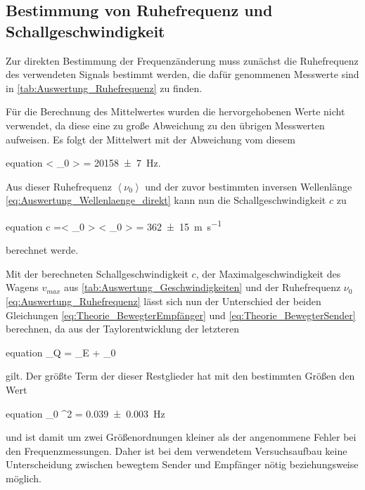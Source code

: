 	 
 	
 	
	
\subsection{Bestimmung von Ruhefrequenz und Schallgeschwindigkeit}
	
	Zur direkten Bestimmung der Frequenzänderung muss zunächst die Ruhefrequenz
	des verwendeten Signals bestimmt werden, die dafür genommenen Messwerte  
	sind in \cref{tab:Auswertung_Ruhefrequenz} zu finden.  
	
		
	
	Für die Berechnung des Mittelwertes wurden die hervorgehobenen Werte nicht verwendet,
	da diese eine zu große Abweichung zu den übrigen Messwerten aufweisen. Es folgt
	der Mittelwert mit der Abweichung vom diesem
	\begin{empheq}{equation}
		\label{eq:Auswertung_Ruhefrequenz}
		\left< \nu_{0} \right> = \SI{20158(7)}{\hertz}.
	\end{empheq} 
	
	Aus dieser Ruhefrequenz $\left< \nu_{0} \right>$ und der zuvor bestimmten inversen Wellenlänge 
	\cref{eq:Auswertung_Wellenlaenge_direkt} kann nun die Schallgeschwindigkeit $c$ zu
	\begin{empheq}{equation}
		c =\left<  \lambda_{0} \right> \cdot \left< \nu_{0} \right> = \SI{362(15)}{\meter\per\second}
	\end{empheq}
	berechnet werde. 
	
	Mit der berechneten Schallgeschwindigkeit $c$, der Maximalgeschwindigkeit des Wagens 
	$v_{max}$ aus \cref{tab:Auswertung_Geschwindigkeiten} und der Ruhefrequenz $\nu_{0}$ 
	\cref{eq:Auswertung_Ruhefrequenz} lässt sich nun der Unterschied der beiden Gleichungen 
	\cref{eq:Theorie_BewegterEmpfänger} und \cref{eq:Theorie_BewegterSender} berechnen,
	da aus der Taylorentwicklung der letzteren 
	\begin{empheq}{equation}
		\nu_{Q} = \nu_{E} + \nu_{0} \cdot {}
	\end{empheq} 
	gilt.
	Der größte Term der dieser Restglieder hat mit den bestimmten Größen den Wert
		\begin{empheq}{equation}
		\nu_{0} \cdot {}^{2} = \SI{0.039(3)}{\hertz}
		\end{empheq} 
	und ist damit um zwei Größenordnungen kleiner als der angenommene Fehler bei den Frequenzmessungen.
	Daher ist bei dem verwendetem Versuchsaufbau keine Unterscheidung zwischen bewegtem Sender und 
	Empfänger nötig beziehungsweise möglich.     
		
